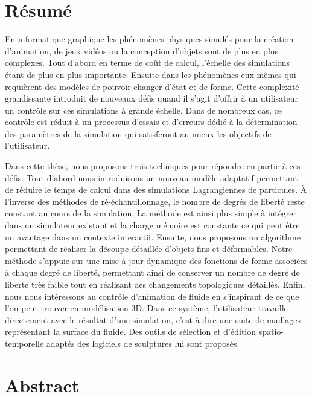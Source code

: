 
\chapter{R\'esum\'e}
En informatique graphique les phénomènes physiques simulés pour la création d'animation, de jeux vidéos ou la conception d'objets sont de plus en plus complexes. Tout d'abord en terme de coût de calcul, l'échelle des simulations étant de plus en plus importante. Ensuite dans les phénomènes eux-mêmes qui requièrent des modèles de pouvoir changer d'état et de forme. Cette complexité grandissante introduit de nouveaux défis quand il s'agit d'offrir à un utilisateur un contrôle sur ces simulations à grande échelle. Dans de nombreux cas, ce contrôle est réduit à un processus d'essais et d'erreurs dédié à la détermination des paramètres de la simulation qui satisferont au mieux les objectifs de l'utilisateur.

Dans cette thèse, nous proposons trois techniques pour répondre en partie à ces défis. Tout d'abord nous introduisons un nouveau modèle adaptatif permettant de réduire le temps de calcul dans des simulations Lagrangiennes de particules. À l'inverse des méthodes de ré-échantillonnage, le nombre de degrés de liberté reste constant au cours de la simulation. La méthode est ainsi plus simple à intégrer dans un simulateur existant et la charge mémoire est constante ce qui peut être un avantage dans un contexte interactif. Ensuite, nous proposons un algorithme permettant de réaliser la découpe détaillée d'objets fins et déformables. Notre méthode s'appuie sur une mise à jour dynamique des fonctions de forme associées à chaque degré de liberté, permettant ainsi de conserver un nombre de degré de liberté très faible tout en réalisant des changements topologiques détaillés. Enfin, nous nous intéressons au contrôle d'animation de fluide en s'inspirant de ce que l'on peut trouver en modélisation 3D. Dans ce système, l'utilisateur travaille directement avec le résultat d'une simulation, c'est à dire une suite de maillages représentant la surface du fluide. Des outils de sélection et d'édition spatio-temporelle adaptés des logiciels de sculptures lui sont proposés.

\chapter{Abstract}